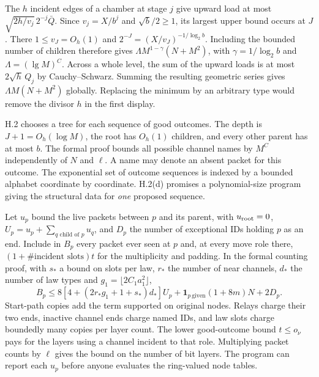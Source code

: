 The $h$ incident edges of a chamber at stage $j$ give upward load at most $\sqrt{2h/v_j}\,2^{-j}\bar Q$. Since $v_j=X/b^j$ and $\sqrt b/2\ge1$, its largest upper bound occurs at $J$. There $1\le v_J=O_h(1)$ and $2^{-J}=(X/v_J)^{-1/\log_2 b}$. Including the bounded number of children therefore gives $\Lambda M^{1-\gamma}(N+M^2)$, with $\gamma=1/\log_2 b$ and $\Lambda=(\lg M)^C$. Across a whole level, the sum of the upward loads is at most $2\sqrt h\,Q_j$ by Cauchy--Schwarz. Summing the resulting geometric series gives $\Lambda M(N+M^2)$ globally. Replacing the minimum by an arbitrary type would remove the divisor $h$ in the first display.


\newpage
{}
H.2 chooses a tree for each sequence of good outcomes. The depth is $J+1=O_h(\log M)$, the root has $O_h(1)$ children, and every other parent has at most $b$. The formal proof bounds all possible channel names by $M^C$ independently of $N$ and $\ell$. A name may denote an absent packet for this outcome. The exponential set of outcome sequences is indexed by a bounded alphabet coordinate by coordinate. H.2(d) promises a polynomial-size program giving the structural data for \emph{one} proposed sequence.

Let $u_p$ bound the live packets between $p$ and its parent, with $u_{\rm root}=0$, $U_p=u_p+\sum_{q\text{ child of }p}u_q$, and $D_p$ the number of exceptional IDs holding $p$ as an end. Include in $B_p$ every packet ever seen at $p$ and, at every move role there, $(1+\#\text{incident slots})t$ for the multiplicity and padding. In the formal counting proof, with $s_*$ a bound on slots per law, $r_*$ the number of near channels, $d_*$ the number of law types and $g_1=\lfloor2C_1a_1^2\rfloor$,
\[
 B_p\le 8[4+(2r_*g_1+1+s_*)d_*]U_p+
      \mathbf1_{p\,\mathrm{given}}(1+8m)N+2D_p .
\]
Start-path copies add the term supported on original nodes. Relays charge their two ends, inactive channel ends charge named IDs, and law slots charge boundedly many copies per layer count. The lower good-outcome bound $t\le o_\nu$ pays for the layers using a channel incident to that role. Multiplying packet counts by $\ell$ gives the bound on the number of bit layers. The program can report each $u_p$ before anyone evaluates the ring-valued node tables.

